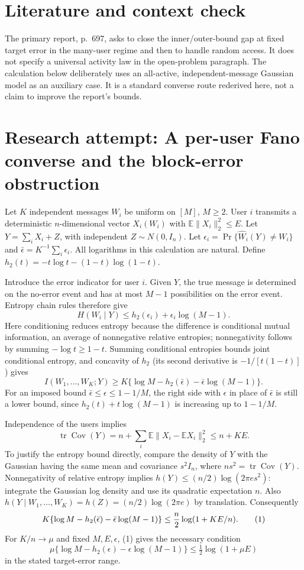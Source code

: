 \documentclass[11pt]{article}
\begin{document}
\section{Literature and context check}
The primary report, p.~697, asks to close the inner/outer-bound gap at fixed target error in the many-user regime and then to handle random access. It does not specify a universal activity law in the open-problem paragraph. The calculation below deliberately uses an all-active, independent-message Gaussian model as an auxiliary case. It is a standard converse route rederived here, not a claim to improve the report's bounds.
\section{Research attempt: A per-user Fano converse and the block-error obstruction}
Let $K$ independent messages $W_i$ be uniform on $[M]$, $M\geq2$. User $i$ transmits a deterministic $n$-dimensional vector $X_i(W_i)$ with $\mathbb E\|X_i\|_2^2\leq E$. Let $Y=\sum_iX_i+Z$, with independent $Z\sim N(0,I_n)$. Let $\epsilon_i=\Pr\{\widehat W_i(Y)\ne W_i\}$ and $\bar\epsilon=K^{-1}\sum_i\epsilon_i$. All logarithms in this calculation are natural. Define $h_2(t)=-t\log t-(1-t)\log(1-t)$.

Introduce the error indicator for user $i$. Given $Y$, the true message is determined on the no-error event and has at most $M-1$ possibilities on the error event. Entropy chain rules therefore give
\[
 H(W_i\mid Y)\leq h_2(\epsilon_i)+\epsilon_i\log(M-1).
\]
Here conditioning reduces entropy because the difference is conditional mutual information, an average of nonnegative relative entropies; nonnegativity follows by summing $-\log t\geq1-t$. Summing conditional entropies bounds joint conditional entropy, and concavity of $h_2$ (its second derivative is $-1/[t(1-t)]$) gives
\[
 I(W_1,\ldots,W_K;Y)\geq
 K\{\log M-h_2(\bar\epsilon)-\bar\epsilon\log(M-1)\}.
\]
For an imposed bound $\bar\epsilon\leq\epsilon\leq1-1/M$, the right side with $\epsilon$ in place of $\bar\epsilon$ is still a lower bound, since $h_2(t)+t\log(M-1)$ is increasing up to $1-1/M$.

Independence of the users implies
\[
 \operatorname{tr}\operatorname{Cov}(Y)
 =n+\sum_i\mathbb E\|X_i-\mathbb EX_i\|_2^2\leq n+KE.
\]
To justify the entropy bound directly, compare the density of $Y$ with the Gaussian having the same mean and covariance $s^2I_n$, where $ns^2=\operatorname{tr}\operatorname{Cov}(Y)$. Nonnegativity of relative entropy implies
$h(Y)\leq (n/2)\log(2\pi e s^2)$: integrate the Gaussian log density and use its quadratic expectation $n$. Also $h(Y\mid W_1,\ldots,W_K)=h(Z)=(n/2)\log(2\pi e)$ by translation. Consequently
\[
 K\{\log M-h_2(\bar\epsilon)-\bar\epsilon\log(M-1)\}
 \leq {n\over2}\log(1+KE/n).                 \tag{1}
\]
For $K/n\to\mu$ and fixed $M,E,\epsilon$, (1) gives the necessary condition
\[
 \mu\{\log M-h_2(\epsilon)-\epsilon\log(M-1)\}
 \leq\tfrac12\log(1+\mu E)
\]
in the stated target-error range.
\end{document}
